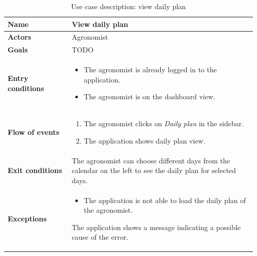 \begin{table}[H]
    \centering
	\begin{tabular}{@{}p{0.25\linewidth} p{0.72\linewidth}@{}}
        \toprule
		\textbf{Name}               & View daily plan\\
		\midrule
		\textbf{Actors}             & Agronomist\\
		\midrule
		\textbf{Goals}              & TODO \\
		\midrule
		
		\textbf{Entry conditions}   & \begin{itemize}[leftmargin=.4cm,noitemsep,topsep=0pt,before=\vspace{-3mm},after=\vspace{-4mm}]
		    \item The agronomist is already logged in to the application.
		    \item The agronomist is on the dashboard view.
		\end{itemize}\\
		\midrule
		
		\textbf{Flow of events}     & \begin{enumerate}[leftmargin=.4cm,noitemsep,topsep=0pt,before=\vspace{-3mm},after=\vspace{-4mm}]
		    \item The agronomist clicks on \textit{Daily plan} in the sidebar.
		    \item The application shows daily plan view.
		\end{enumerate}\\
		\midrule
		\textbf{Exit conditions}    & The agronomist can choose different days from the calendar on the left to see the daily plan for selected days. \\
		\midrule
		
		\textbf{Exceptions}         & 
	    \begin{itemize}[leftmargin=.4cm,noitemsep,topsep=0pt,before=\vspace{-3mm}]
		   \item The application is not able to load the daily plan of the agronomist.
		\end{itemize}
		The application shows a message indicating a possible cause of the error.
		\\\bottomrule
	\end{tabular}
	\caption{Use case description: view daily plan} 
\end{table}

